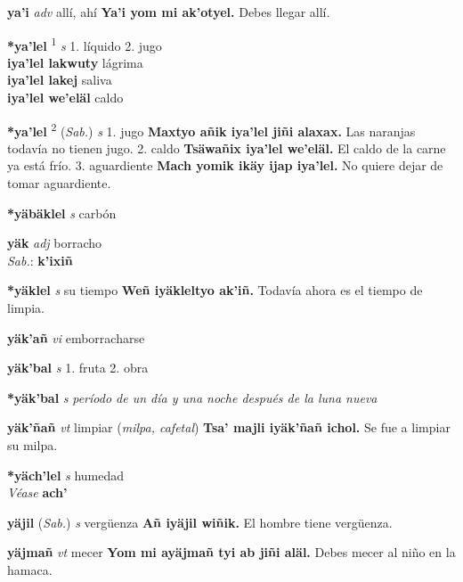 \documentclass[10pt]{scrbook}
\newcommand{\entry}[1]{\textbf{#1}}
\newcommand{\onedefinition}[1]{#1.}
\newcommand{\defsuperscript}[1]{\textsuperscript{#1}}
\newcommand{\nontranslationdef}[1]{\textit{#1}}
\newcommand{\partofspeech}[1]{\textit{#1}}
\newcommand{\spanishtranslation}[1]{#1}
\newcommand{\clarification}[1]{(\textit{#1})}
\newcommand{\cholexample}[1]{\textbf{#1}}
\newcommand{\exampletranslation}[1]{#1}
\newcommand{\dialectvariant}[1]{\\\textit{#1}:}
\newcommand{\dialectword}[1]{\textbf{#1}}
\newcommand{\alsosee}[1]{\\\textit{Véase} \textbf{#1}}
\newcommand{\relevantdialect}[1]{(\textit{#1})}
\newcommand{\secondaryentry}[1]{\\\textbf{#1}}
\newcommand{\secondtranslation}[1]{#1}
\begin{document}
\begin{multicols}{2}
\entry{ya'i}
\partofspeech{adv}
\spanishtranslation{allí, ahí}
\cholexample{Ya'i yom mi ak'otyel.}
\exampletranslation{Debes llegar allí.}

\entry{*ya'lel}
\defsuperscript{1}
\partofspeech{s}
\onedefinition{1}
\spanishtranslation{líquido}
\onedefinition{2}
\spanishtranslation{jugo}
\secondaryentry{iya'lel lakwuty}
\secondtranslation{lágrima}
\secondaryentry{iya'lel lakej}
\secondtranslation{saliva}
\secondaryentry{iya'lel we'eläl}
\secondtranslation{caldo}

\entry{*ya'lel}
\defsuperscript{2}
\relevantdialect{Sab.}
\partofspeech{s}
\onedefinition{1}
\spanishtranslation{jugo}
\cholexample{Maxtyo añik iya'lel jiñi alaxax.}
\exampletranslation{Las naranjas todavía no tienen jugo.}
\onedefinition{2}
\spanishtranslation{caldo}
\cholexample{Tsäwañix iya'lel we'eläl.}
\exampletranslation{El caldo de la carne ya está frío.}
\onedefinition{3}
\spanishtranslation{aguardiente}
\cholexample{Mach yomik ikäy ijap iya'lel.}
\exampletranslation{No quiere dejar de tomar aguardiente.}

\entry{*yäbäklel}
\partofspeech{s}
\spanishtranslation{carbón}

\entry{yäk}
\partofspeech{adj}
\spanishtranslation{borracho}
\dialectvariant{Sab.}
\dialectword{k'ixiñ}

\entry{*yäklel}
\partofspeech{s}
\spanishtranslation{su tiempo}
\cholexample{Weñ iyäkleltyo ak'iñ.}
\exampletranslation{Todavía ahora es el tiempo de limpia.}

\entry{yäk'añ}
\partofspeech{vi}
\spanishtranslation{emborracharse}

\entry{yäk'bal}
\partofspeech{s}
\onedefinition{1}
\spanishtranslation{fruta}
\onedefinition{2}
\spanishtranslation{obra}

\entry{*yäk'bal}
\partofspeech{s}
\nontranslationdef{período de un día y una noche después de la luna nueva}

\entry{yäk'ñañ}
\partofspeech{vt}
\spanishtranslation{limpiar}
\clarification{milpa, cafetal}
\cholexample{Tsa' majli iyäk'ñañ ichol.}
\exampletranslation{Se fue a limpiar su milpa.}

\entry{*yäch'lel}
\partofspeech{s}
\spanishtranslation{humedad}
\alsosee{ach'}

\entry{yäjil}
\relevantdialect{Sab.}
\partofspeech{s}
\spanishtranslation{vergüenza}
\cholexample{Añ iyäjil wiñik.}
\exampletranslation{El hombre tiene vergüenza.}

\entry{yäjmañ}
\partofspeech{vt}
\spanishtranslation{mecer}
\cholexample{Yom mi ayäjmañ tyi ab jiñi aläl.}
\exampletranslation{Debes mecer al niño en la hamaca.}


\end{multicols}
\end{document}
